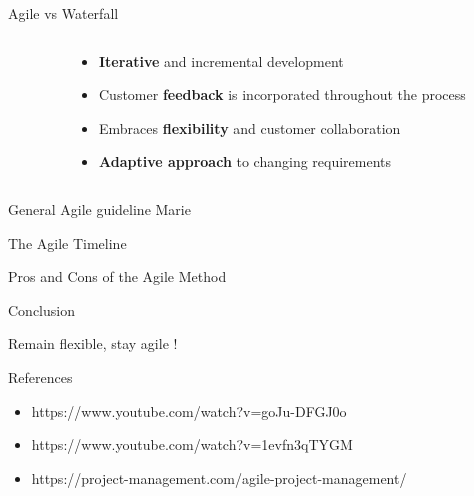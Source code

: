 \documentclass[10pt]{beamer}
\begin{document}
\begin{frame}{Agile vs Waterfall}
  \vspace{2cm}
  \begin{columns}[T]

    \begin{column}{0.5\textwidth}
    \end{column}

    \begin{column}{0.5\textwidth}
      \begin{itemize}
        \item<2-> \textbf{Iterative} and incremental development 
        \item<3-> Customer \textbf{feedback} is incorporated throughout the process
        \item<4-> Embraces \textbf{flexibility} and customer collaboration
        \item<5-> \textbf{Adaptive approach }to changing requirements
      \end{itemize}
    \end{column}

  \end{columns}
\end{frame}

\begin{frame}{General Agile guideline}
    Marie
\end{frame}

\begin{frame}{The Agile Timeline}
\end{frame}

\begin{frame}{Pros and Cons of the Agile Method}
\end{frame}

\begin{frame}{Conclusion}

  Remain flexible, stay agile !
  
\end{frame}

\begin{frame}{References}
  \begin{itemize}
    \item https://www.youtube.com/watch?v=goJu-DFGJ0o
    \item https://www.youtube.com/watch?v=1evfn3qTYGM
    \item https://project-management.com/agile-project-management/
  \end{itemize}
\end{frame}
\end{document}
